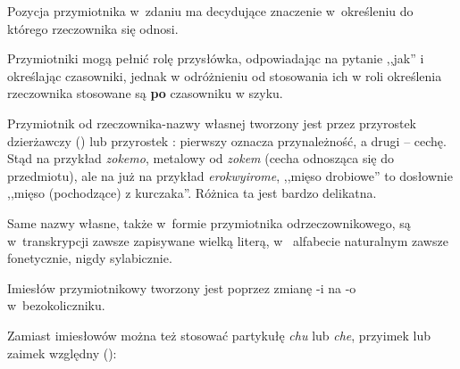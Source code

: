 \begin{spacing}{1.1}
Pozycja przymiotnika w~zdaniu ma decydujące znaczenie w~określeniu do którego
rzeczownika się odnosi.




Przymiotniki mogą pełnić rolę przysłówka, odpowiadając na pytanie ,,jak'' i
określając czasowniki, jednak w odróżnieniu od stosowania ich w roli określenia
rzeczownika stosowane są \textbf{po} czasowniku w szyku.


Przymiotnik od rzeczownika-nazwy własnej tworzony jest przez przyrostek
dzierżawczy  () lub przyrostek : pierwszy oznacza
przynależność, a drugi -- cechę. Stąd na przykład \emph{zokemo}, metalowy od
\emph{zokem} (cecha odnosząca się do przedmiotu), ale na już na przykład
\emph{erokwyirome}, ,,mięso drobiowe'' to dosłownie ,,mięso (pochodzące) z
kurczaka''. Różnica ta jest bardzo delikatna.

Same nazwy własne, także w~formie przymiotnika odrzeczownikowego, są
w~transkrypcji zawsze zapisywane wielką literą, w~ alfabecie naturalnym zawsze
fonetycznie, nigdy sylabicznie.

Imiesłów przymiotnikowy tworzony jest poprzez zmianę -i na -o w~bezokoliczniku.



Zamiast imiesłowów można też stosować partykułę \emph{chu} lub \emph{che},
przyimek lub zaimek względny (\Rel{}):



\end{spacing}
